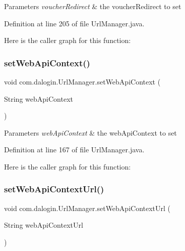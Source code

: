 \begin{DoxyParams}{Parameters}
{\em voucher\+Redirect} & the voucher\+Redirect to set \\
\hline
\end{DoxyParams}


Definition at line 205 of file Url\+Manager.\+java.

Here is the caller graph for this function\+:
\mbox{\label{classcom_1_1dalogin_1_1_url_manager_a09d2ebb1e23646cebad40ac5d5dcc2ab}} 
\subsubsection{\texorpdfstring{set\+Web\+Api\+Context()}{setWebApiContext()}}
{\footnotesize\ttfamily void com.\+dalogin.\+Url\+Manager.\+set\+Web\+Api\+Context (\begin{DoxyParamCaption}\item[{String}]{web\+Api\+Context }\end{DoxyParamCaption})}


\begin{DoxyParams}{Parameters}
{\em web\+Api\+Context} & the web\+Api\+Context to set \\
\hline
\end{DoxyParams}


Definition at line 167 of file Url\+Manager.\+java.

Here is the caller graph for this function\+:
\mbox{\label{classcom_1_1dalogin_1_1_url_manager_a7eabfd586a88ee1679e4dc1b18f1d823}} 
\subsubsection{\texorpdfstring{set\+Web\+Api\+Context\+Url()}{setWebApiContextUrl()}}
{\footnotesize\ttfamily void com.\+dalogin.\+Url\+Manager.\+set\+Web\+Api\+Context\+Url (\begin{DoxyParamCaption}\item[{String}]{web\+Api\+Context\+Url }\end{DoxyParamCaption})}


